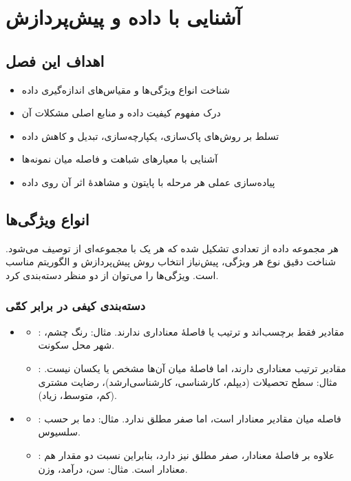 \chapter{آشنایی با داده و پیش‌پردازش}
\label{ch:data}

\section*{اهداف این فصل}
\begin{itemize}
    \item شناخت انواع ویژگی‌ها و مقیاس‌های اندازه‌گیری داده
    \item درک مفهوم کیفیت داده و منابع اصلی مشکلات آن
    \item تسلط بر روش‌های پاک‌سازی، یکپارچه‌سازی، تبدیل و کاهش داده
    \item آشنایی با معیارهای شباهت و فاصله میان نمونه‌ها
    \item پیاده‌سازی عملی هر مرحله با پایتون و مشاهدهٔ اثر آن روی داده
\end{itemize}

\section{انواع ویژگی‌ها}
\label{sec:attribute-types}

هر مجموعه داده از تعدادی 
تشکیل شده که هر یک با مجموعه‌ای از 
توصیف می‌شود. شناخت دقیق نوع هر ویژگی، پیش‌نیاز انتخاب روش پیش‌پردازش و الگوریتم
مناسب است. ویژگی‌ها را می‌توان از دو منظر دسته‌بندی کرد.

\subsection{دسته‌بندی کیفی در برابر کمّی}

\begin{itemize}
    \item {}
    \begin{itemize}
        \item {}: مقادیر فقط برچسب‌اند و ترتیب یا فاصلهٔ
              معناداری ندارند. مثال: رنگ چشم، شهر محل سکونت.
        \item {}: مقادیر ترتیب معناداری دارند، اما فاصلهٔ
              میان آن‌ها مشخص یا یکسان نیست. مثال: سطح تحصیلات (دیپلم، کارشناسی،
              کارشناسی‌ارشد)، رضایت مشتری (کم، متوسط، زیاد).
    \end{itemize}
    \item {}
    \begin{itemize}
        \item {}: فاصله میان مقادیر معنادار است، اما
              صفر مطلق ندارد. مثال: دما بر حسب سلسیوس.
        \item {}: علاوه بر فاصلهٔ معنادار، صفر مطلق نیز دارد،
              بنابراین نسبت دو مقدار هم معنادار است. مثال: سن، درآمد، وزن.
    \end{itemize}
\end{itemize}

